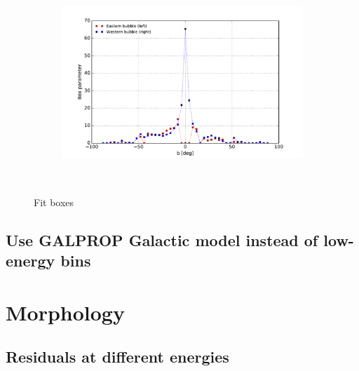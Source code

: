\documentclass[a4paper]{article}
\begin{document}
\begin{figure}[h]
{\begin{subfigure}[b]{.5\textwidth}
	\end{subfigure}%
	\begin{subfigure}[b]{.5\textwidth}
		\centering
		\includegraphics[width=.95\textwidth]{FitE_boxprof_at_0-1_to_1-1663_norm_fitbubshape.pdf}
	\end{subfigure}%
	}\\
\caption{Fit boxes}
\label{Fit_IC_pi0_to_ROI}
\end{figure}






\subsection{Use GALPROP Galactic model instead of low-energy bins}



\section{Morphology}

\subsection{Residuals at different energies}
\end{document}
